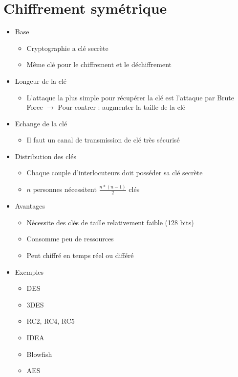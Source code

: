 \documentclass[a4paper]{article}
\begin{document}
\section{Chiffrement symétrique}
\begin{itemize}[label=\textbullet, font=\Large]
    \item Base
    \begin{itemize}[label=, font=\scriptsize]
        \item Cryptographie a clé secrète
        \item Même clé pour le chiffrement et le déchiffrement
    \end{itemize}
    \item Longeur de la clé
    \begin{itemize}[label=, font=\scriptsize]
        \item L'attaque la plus simple pour récupérer la clé est l'attaque par Brute Force $\rightarrow$ Pour contrer : augmenter la taille de la clé
    \end{itemize}
    \item Echange de la clé
    \begin{itemize}[label=, font=\scriptsize]
        \item Il faut un canal de transmission de clé très sécurisé
    \end{itemize}
    \item Distribution des clés
    \begin{itemize}[label=, font=\scriptsize]
        \item Chaque couple d'interlocuteurs doit posséder sa clé secrète
        \item $n$ personnes nécessitent $\frac{n*(n-1)}{2}$ clés
    \end{itemize}
    \item Avantages
    \begin{itemize}[label=, font=\scriptsize]
        \item Nécessite des clés de taille relativement faible (128 bits)
        \item Consomme peu de ressources
        \item Peut chiffré en temps réel ou différé
    \end{itemize}
    \item Exemples
    \begin{itemize}[label=, font=\scriptsize]
        \item DES 
        \item 3DES 
        \item RC2, RC4, RC5
        \item IDEA 
        \item Blowfish 
        \item AES
    \end{itemize}
\end{itemize}
\end{document}
